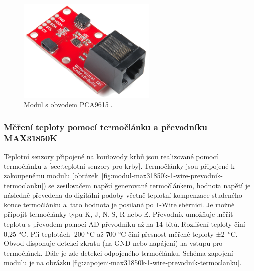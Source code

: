 \begin{figure}[H]
    \centering
    \includegraphics[width=0.6\textwidth]{images/modul-pca9615-i2c-sbernice.png}
    \caption[Modul s obvodem PCA9615.]{Modul s obvodem PCA9615 \cite{pca9615-i2c-modul}.}
    \label{fig:modul-pca9615-i2c-sbernice}
\end{figure}

\subsubsection{Měření teploty pomocí termočlánku a převodníku MAX31850K}
Teplotní senzory připojené na kouřovody krbů jsou realizované pomocí termočlánku z \ref{sec:teplotni-senzory-pro-krby}. Termočlánky jsou připojené k zakoupenému modulu (obrázek~\ref{fig:modul-max31850k-1-wire-prevodnik-termoclanku}) se zesilovačem napětí generované termočlánkem, hodnota napětí je následně převedena do digitální podoby včetně teplotní kompenzace studeného konce termočlánku a~tato hodnota je posílaná po 1-Wire sběrnici. Je možné připojit termočlánky typu K, J, N, S, R nebo E. Převodník umožňuje měřit teplotu s převodem pomocí AD převodníku až na 14 bitů. Rozlišení teploty činí 0,25 °C. Při teplotách -200 °C až 700 °C činí přesnost měřené teploty ±2~°C. Obvod disponuje detekcí zkratu (na GND nebo napájení) na vstupu pro termočlánek. Dále je zde detekci odpojeného termočlánku. Schéma zapojení modulu je na obrázku \ref{fig:zapojeni-max31850k-1-wire-prevodnik-termoclanku}.


